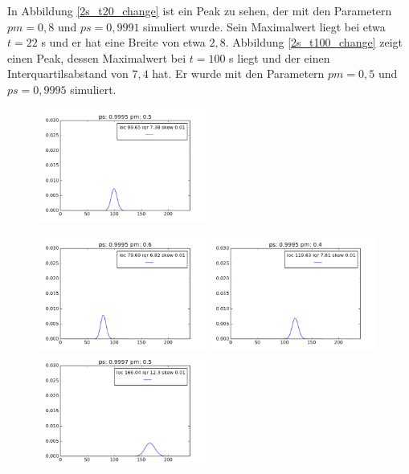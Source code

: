 In Abbildung \ref{2s_t20_change} ist ein Peak zu sehen, der mit den Parametern $pm = 0,8$ und $ps = 0,9991$ simuliert wurde. Sein Maximalwert liegt bei etwa $t = 22$ s und er hat eine Breite von etwa $2,8$. Abbildung \ref{2s_t100_change} zeigt einen Peak, dessen Maximalwert bei $t=100$ s liegt und der einen Interquartilsabstand von $7,4$ hat. Er wurde mit den Parametern $pm = 0,5$ und $ps = 0,9995$ simuliert.
\begin{figure}[h]
\begin{center}
\includegraphics[width=0.49\textwidth]{bilder/2s_t100}
\end{center}
\includegraphics[width=0.49\textwidth]{bilder/2s_t100_pmp}
\includegraphics[width=0.49\textwidth]{bilder/2s_t100_pmm}
\includegraphics[width=0.49\textwidth]{bilder/2s_t100_psp}

\end{figure}
